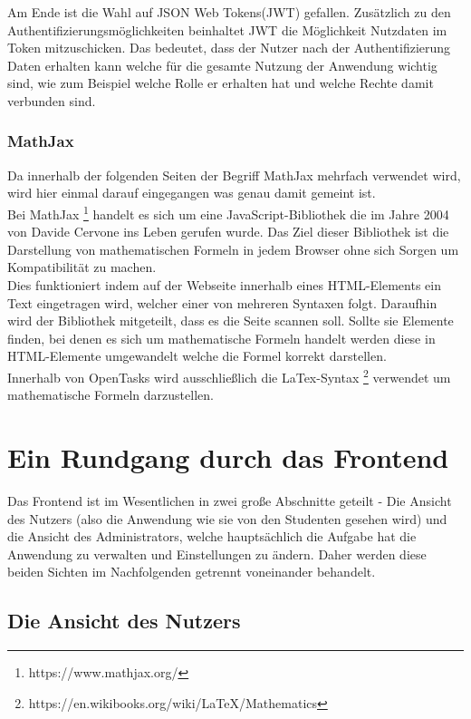 Am Ende ist die Wahl auf JSON Web Tokens(JWT) gefallen. Zusätzlich zu den Authentifizierungsmöglichkeiten beinhaltet JWT die Möglichkeit Nutzdaten im Token mitzuschicken. Das bedeutet, dass der Nutzer nach der Authentifizierung Daten erhalten kann welche für die gesamte Nutzung der Anwendung wichtig sind, wie zum Beispiel welche Rolle er erhalten hat und welche Rechte damit verbunden sind. 

\subsection{MathJax}

Da innerhalb der folgenden Seiten der Begriff MathJax mehrfach verwendet wird, wird hier einmal darauf eingegangen was genau damit gemeint ist. \\

Bei MathJax \footnote{https://www.mathjax.org/} handelt es sich um eine JavaScript-Bibliothek die im Jahre 2004 von Davide Cervone ins Leben gerufen wurde. Das Ziel dieser Bibliothek ist die Darstellung von mathematischen Formeln in jedem Browser ohne sich Sorgen um Kompatibilität zu machen. \\
Dies funktioniert indem auf der Webseite innerhalb eines HTML-Elements ein Text eingetragen wird, welcher einer von mehreren Syntaxen folgt. Daraufhin wird der Bibliothek mitgeteilt, dass es die Seite scannen soll. Sollte sie Elemente finden, bei denen es sich um mathematische Formeln handelt werden diese in HTML-Elemente umgewandelt welche die Formel korrekt darstellen. \\

Innerhalb von OpenTasks wird ausschließlich die LaTex-Syntax \footnote{https://en.wikibooks.org/wiki/LaTeX/Mathematics} verwendet um mathematische Formeln darzustellen.

\chapter{Ein Rundgang durch das Frontend}

Das Frontend ist im Wesentlichen in zwei große Abschnitte geteilt - Die Ansicht des Nutzers (also die Anwendung wie sie von den Studenten gesehen wird) und die Ansicht des Administrators, welche hauptsächlich die Aufgabe hat die Anwendung zu verwalten und Einstellungen zu ändern. Daher werden diese beiden Sichten im Nachfolgenden getrennt voneinander behandelt.

\section{Die Ansicht des Nutzers}

